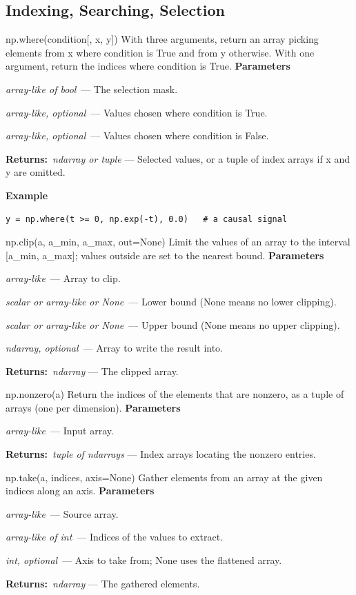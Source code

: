 \documentclass[10pt]{article}
\newenvironment{params}
  {\smallskip\textbf{\small\color{accent}Parameters}\par\nopagebreak
   \begin{description}[leftmargin=1.3em,itemsep=1.5pt,parsep=0pt,topsep=1pt,
      labelindent=0pt,style=sameline,font=\normalfont]}
  {\end{description}}
\newcommand{\pitem}[3]{\item[{\ttfamily\color{accent}#1}]{\itshape #2}\ --- #3}
\newcommand{\preturn}[2]{\smallskip\textbf{\small\color{accent}Returns:}\ {\itshape #1} --- #2\par}
\begin{document}
\subsection{Indexing, Searching, Selection}
\begin{func}{np.where(condition[, x, y])}
With three arguments, return an array picking elements from x where condition is True and from y otherwise. With one argument, return the indices where condition is True.
\begin{params}
\pitem{condition}{array-like of bool}{The selection mask.}
\pitem{x}{array-like, optional}{Values chosen where condition is True.}
\pitem{y}{array-like, optional}{Values chosen where condition is False.}
\end{params}
\preturn{ndarray or tuple}{Selected values, or a tuple of index arrays if x and y are omitted.}
\smallskip\textbf{\small\color{accent}Example}
\begin{lstlisting}[style=py]
y = np.where(t >= 0, np.exp(-t), 0.0)   # a causal signal
\end{lstlisting}
\end{func}
\medskip

\begin{func}{np.clip(a, a\_min, a\_max, out=None)}
Limit the values of an array to the interval [a\_min, a\_max]; values outside are set to the nearest bound.
\begin{params}
\pitem{a}{array-like}{Array to clip.}
\pitem{a\_min}{scalar or array-like or None}{Lower bound (None means no lower clipping).}
\pitem{a\_max}{scalar or array-like or None}{Upper bound (None means no upper clipping).}
\pitem{out}{ndarray, optional}{Array to write the result into.}
\end{params}
\preturn{ndarray}{The clipped array.}
\end{func}
\medskip

\begin{func}{np.nonzero(a)}
Return the indices of the elements that are nonzero, as a tuple of arrays (one per dimension).
\begin{params}
\pitem{a}{array-like}{Input array.}
\end{params}
\preturn{tuple of ndarrays}{Index arrays locating the nonzero entries.}
\end{func}
\medskip

\begin{func}{np.take(a, indices, axis=None)}
Gather elements from an array at the given indices along an axis.
\begin{params}
\pitem{a}{array-like}{Source array.}
\pitem{indices}{array-like of int}{Indices of the values to extract.}
\pitem{axis}{int, optional}{Axis to take from; None uses the flattened array.}
\end{params}
\preturn{ndarray}{The gathered elements.}
\end{func}
\medskip
\end{document}
